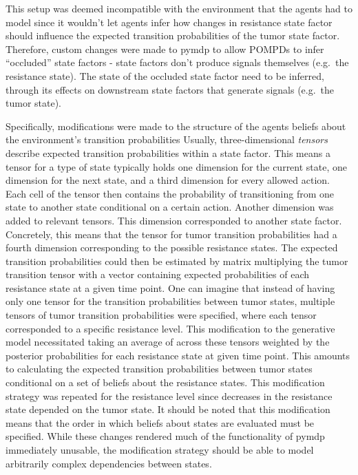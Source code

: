 \documentclass[
]{article}
\begin{document}
This setup was deemed incompatible with the environment that the agents
had to model since it wouldn't let agents infer how changes in
resistance state factor should influence the expected transition
probabilities of the tumor state factor. Therefore, custom changes were
made to pymdp to allow POMPDs to infer ``occluded'' state factors -
state factors don't produce signals themselves (e.g.~the resistance
state). The state of the occluded state factor need to be inferred,
through its effects on downstream state factors that generate signals
(e.g.~the tumor state).

Specifically, modifications were made to the structure of the agents
beliefs about the environment's transition probabilities Usually,
three-dimensional \emph{tensors} describe expected transition
probabilities within a state factor. This means a tensor for a type of
state typically holds one dimension for the current state, one dimension
for the next state, and a third dimension for every allowed action. Each
cell of the tensor then contains the probability of transitioning from
one state to another state conditional on a certain action. Another
dimension was added to relevant tensors. This dimension corresponded to
another state factor. Concretely, this means that the tensor for tumor
transition probabilities had a fourth dimension corresponding to the
possible resistance states. The expected transition probabilities could
then be estimated by matrix multiplying the tumor transition tensor with
a vector containing expected probabilities of each resistance state at a
given time point. One can imagine that instead of having only one tensor
for the transition probabilities between tumor states, multiple tensors
of tumor transition probabilities were specified, where each tensor
corresponded to a specific resistance level. This modification to the
generative model necessitated taking an average of across these tensors
weighted by the posterior probabilities for each resistance state at
given time point. This amounts to calculating the expected transition
probabilities between tumor states conditional on a set of beliefs about
the resistance states. This modification strategy was repeated for the
resistance level since decreases in the resistance state depended on the
tumor state. It should be noted that this modification means that the
order in which beliefs about states are evaluated must be specified.
While these changes rendered much of the functionality of pymdp
immediately unusable, the modification strategy should be able to model
arbitrarily complex dependencies between states.
\end{document}
